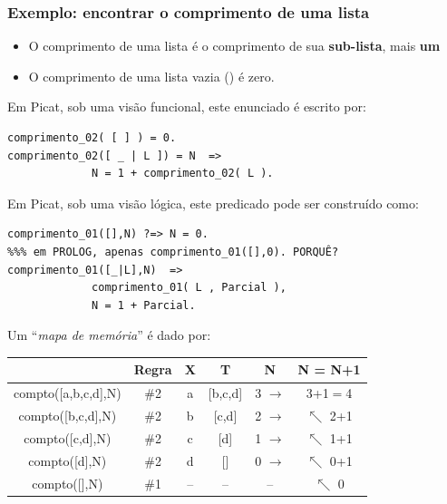 \begin{frame}[fragile, allowframebreaks=0.9]
\frametitle{Exemplo: encontrar o comprimento de uma lista}
 
\begin{itemize}
   \item O comprimento de uma lista é o comprimento de sua \textbf{sub-lista}, mais \textbf{um}
   \item O comprimento de uma lista vazia (\lbrack  \rbrack) é zero.
 \end{itemize} 
 
Em Picat, sob uma visão funcional, este enunciado é escrito por:

\begin{verbatim}
comprimento_02( [ ] ) = 0.
comprimento_02([ _ | L ]) = N  => 
             N = 1 + comprimento_02( L ).
\end{verbatim}

\framebreak

Em Picat, sob uma visão lógica, este predicado 
pode ser construído como:

\begin{verbatim}
comprimento_01([],N) ?=> N = 0. 
%%% em PROLOG, apenas comprimento_01([],0). PORQUÊ?
comprimento_01([_|L],N)  => 
             comprimento_01( L , Parcial ), 
             N = 1 + Parcial.
\end{verbatim}

\framebreak
Um ``{\em mapa de memória}'' é dado por:

\begin{center}
\begin{tabular}[c]{|c|c|c|c|c|c|}
\hline
& Regra & X & T & N & N = N+1\\\hline
compto([a,b,c,d],N) & \#2 & a & [b,c,d] & 3 $\rightarrow$ & 3+1$=$4\\\hline
compto([b,c,d],N) & \#2 & b & [c,d] & 2 $\rightarrow$ & $\nwarrow$ 2+1\\\hline
compto([c,d],N) & \#2 & c & [d] & 1 $\rightarrow$ & $\nwarrow$ 1+1\\\hline
compto([d],N) & \#2 & d & [] & 0 $\rightarrow$ & $\nwarrow$ 0+1\\\hline
compto([],N) & \#1 & -- & -- & -- & $\nwarrow$ 0\\\hline
\end{tabular}
\end{center}
 

\end{frame}


